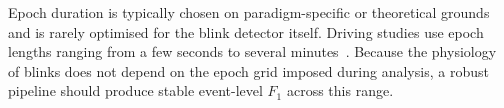 Epoch duration is typically chosen on paradigm-specific or theoretical grounds and is rarely optimised for the blink detector itself. Driving studies use epoch lengths ranging from a few seconds to several minutes~\citep{ahn2016exploring,chai2017improving,lan2024driving,dai2023detection,chen2022fatigue}. Because the physiology of blinks does not depend on the epoch grid imposed during analysis, a robust pipeline should produce stable event-level $F_1$ across this range.




